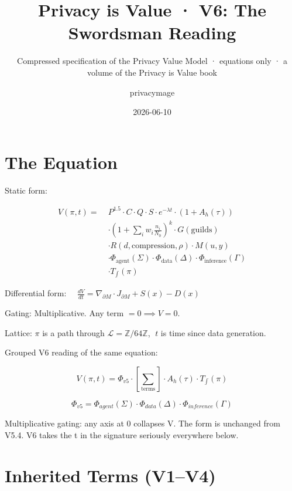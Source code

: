 \documentclass[
]{article}
\title{Privacy is Value · V6: The Swordsman Reading}
\subtitle{Compressed specification of the Privacy Value Model ·
equations only · a volume of the Privacy is Value book}
\author{privacymage}
\date{2026-06-10}
\begin{document}
\maketitle

\section{The Equation}\label{the-equation}

Static form:

\[\boxed{\begin{aligned}
V(\pi, t) = \; & P^{1.5} \cdot C \cdot Q \cdot S \cdot e^{-\lambda t} \cdot (1 + A_h(\tau)) \\
& \cdot \left(1 + \sum_i w_i \frac{n_i}{N_0}\right)^k \cdot G(\text{guilds}) \\
& \cdot R(d, \text{compression}, \rho) \cdot M(u, y) \\
& \cdot \Phi_{\text{agent}}(\Sigma) \cdot \Phi_{\text{data}}(\Delta) \cdot \Phi_{\text{inference}}(\Gamma) \\
& \cdot T_{\!\int}(\pi)
\end{aligned}}\]

Differential form:
\(\quad \frac{dV}{dt} = \nabla_{\partial M} \cdot J_{\partial M} + S(x) - D(x)\)

Gating: Multiplicative. Any term \(= 0 \implies V = 0\).

Lattice: \(\pi\) is a path through
\(\mathcal{L} = \mathbb{Z}/64\mathbb{Z}\), \(\;t\) is time since data
generation.

Grouped V6 reading of the same equation:

\[V(\pi, t) = \Phi_{v5} \cdot \left[ \sum_{\text{terms}} \right] \cdot A_h(\tau) \cdot T_{\int}(\pi)\]

\[\Phi_{v5} = \Phi_{agent}(\Sigma) \cdot \Phi_{data}(\Delta) \cdot \Phi_{inference}(\Gamma)\]

Multiplicative gating: any axis at 0 collapses V. The form is unchanged
from V5.4. V6 takes the t in the signature seriously everywhere below.

\section{Inherited Terms (V1--V4)}\label{inherited-terms-v1v4}
\end{document}
